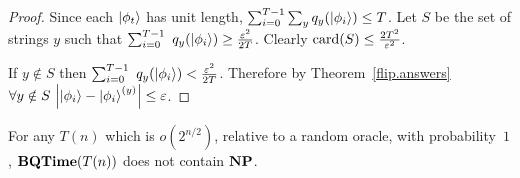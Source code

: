 \begin{proof}
Since each ${| \phi_t \rangle}$ has unit length,
$\sum_{i=0}^{T-1} \sum_{y} q_y ({| \phi_i \rangle}) \leq T$.
Let $S$ be the set of strings $y$ such that
$\sum_{i=0}^{T-1} ~ q_y ({| \phi_i \rangle}) \geq {\varepsilon^2 \over 2 T}$.
Clearly ${\mbox{card}(S)} \leq {2 T^2 \over \varepsilon^2}$.

If $y \notin S$ then
$\sum_{i=0}^{T-1} ~ q_y ({| \phi_i \rangle}) < {\varepsilon^2 \over 2 T}$.
Therefore by Theorem~\ref{flip.answers}
$\forall y \notin S ~ {\left| {| \phi_i \rangle}-{| \phi_i \rangle}^{(y)} \right|} \leq \varepsilon$.
\end{proof}

\begin{theorem}\label{notNP}
For any $T(n)$ which is $o(2^{n/2})$, relative to a random oracle,
with probability~$1$, $\mbox{\bf BQTime}(T(n))$ does not contain $\mbox{\bf NP}$.
\end{theorem}

